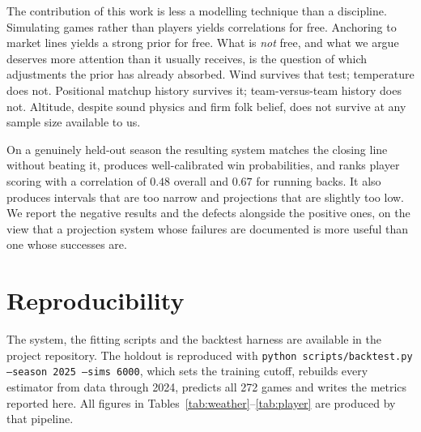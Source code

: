 \documentclass[11pt,a4paper]{article}
\begin{document}
The contribution of this work is less a modelling technique than a discipline.
Simulating games rather than players yields correlations for free. Anchoring to
market lines yields a strong prior for free. What is \emph{not} free, and what
we argue deserves more attention than it usually receives, is the question of
which adjustments the prior has already absorbed. Wind survives that test;
temperature does not. Positional matchup history survives it; team-versus-team
history does not. Altitude, despite sound physics and firm folk belief, does not
survive at any sample size available to us.

On a genuinely held-out season the resulting system matches the closing line
without beating it, produces well-calibrated win probabilities, and ranks player
scoring with a correlation of $0.48$ overall and $0.67$ for running backs. It
also produces intervals that are too narrow and projections that are slightly
too low. We report the negative results and the defects alongside the positive
ones, on the view that a projection system whose failures are documented is more
useful than one whose successes are.

\section*{Reproducibility}

The system, the fitting scripts and the backtest harness are available in the
project repository. The holdout is reproduced with
\texttt{python scripts/backtest.py --season 2025 --sims 6000}, which sets the
training cutoff, rebuilds every estimator from data through 2024, predicts all
272 games and writes the metrics reported here. All figures in
Tables~\ref{tab:weather}--\ref{tab:player} are produced by that pipeline.
\end{document}
